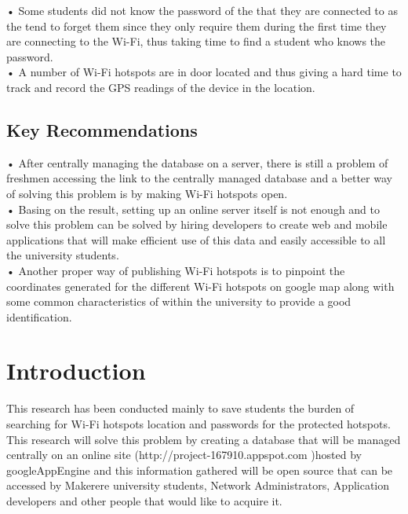 \documentclass[14pt, a4paper]{article}
\begin{document}
•	Some students did not know the password of the that they are connected to as the tend to forget them since they only require them during the first time they are connecting to the Wi-Fi, thus taking time to find a student who knows the password.\\

•	A number of Wi-Fi hotspots are in door located and thus giving a hard time to track and record the GPS readings of the device in the location.\\

				\subsection{Key Recommendations}


•	After centrally managing the database on a server, there is still a problem of freshmen accessing the link to the centrally managed database and a better way of solving this problem is by making Wi-Fi hotspots open.\\


•	Basing on the result, setting up an online server itself is not enough and to solve this problem can be solved by hiring developers to create web and mobile applications that will make efficient use of this data and easily accessible to all the university students.\\


•	Another proper way of publishing Wi-Fi hotspots is to pinpoint the coordinates generated for the different Wi-Fi hotspots on google map along with some common characteristics of within the university to provide a good identification. \\

				\section{Introduction}

This research has been conducted mainly to save students the burden of searching for Wi-Fi hotspots location and passwords for the protected hotspots. This research will solve this problem by creating a database that will be managed centrally on an online site (http://project-167910.appspot.com )hosted by googleAppEngine and this information gathered will be open source that can be accessed by Makerere university students, Network Administrators, Application developers and other people that would like to acquire it.\\
\end{document}
